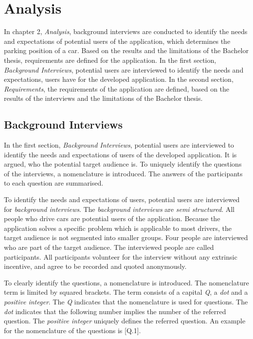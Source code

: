 \chapter{Analysis}
In chapter 2, \textit{Analysis}, background interviews are conducted to identify the needs and expectations of potential users of the application, which determines the parking position of a car. Based on the results and the limitations of the Bachelor thesis, requirements are defined for the application.
In the first section, \textit{Background Interviews}, potential users are interviewed to identify the needs and expectations, users have for the developed application.
In the second section, \textit{Requirements}, the requirements of the application are defined, based on the results of the interviews and the limitations of the Bachelor thesis.

\section{Background Interviews}
In the first section, \textit{Background Interviews}, potential users are interviewed to identify the needs and expectations of  users of the developed application. It is argued, who the potential target audience is. To uniquely identify the questions of the interviews, a nomenclature is introduced. The answers of the participants to each question are summarised.

To identify the needs and expectations of users, potential users are interviewed for \textit{background interviews}. The \textit{background interviews} are \textit{semi structured}. All people who drive cars are potential users of the application. Because the application solves a specific problem which is applicable to most drivers, the target audience is not segmented into smaller groups. Four people are interviewed who are part of the target audience. The interviewed people are called participants. All participants volunteer for the interview without any extrinsic incentive, and agree to be recorded and quoted anonymously. \cite{Abras2004} \cite{wilson2013interview}

To clearly identify the questions, a nomenclature is introduced. The nomenclature term is limited by squared brackets. The term consists of a capital \textit{Q}, a \textit{dot} and a \textit{positive integer}. The \textit{Q} indicates that the nomenclature is used for questions. The \textit{dot} indicates that the following number implies the number of the referred question. The \textit{positive integer} uniquely defines the referred question. An example for the nomenclature of the questions is [Q.1].

